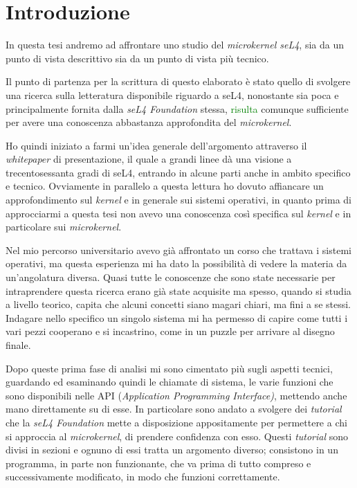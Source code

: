 \chapter{Introduzione}
In questa tesi andremo ad affrontare uno studio del \textit{microkernel seL4}, sia da un punto di vista descrittivo sia da un punto di vista più tecnico.

Il punto di partenza per la scrittura di questo elaborato è stato quello di svolgere una ricerca sulla letteratura disponibile riguardo a seL4, nonostante sia poca e principalmente fornita dalla \textit{seL4 Foundation} stessa, \textcolor{green}{risulta} comunque sufficiente per avere una conoscenza abbastanza approfondita del \textit{microkernel}.

Ho quindi iniziato a farmi un'idea generale dell'argomento attraverso il \textit{whitepaper} \cite{sel4-whitepaper} di presentazione, il quale a grandi linee dà una visione a trecentosessanta gradi di seL4, entrando in alcune parti anche in ambito specifico e tecnico. Ovviamente in parallelo a questa lettura ho dovuto affiancare un approfondimento sul \textit{kernel} e in generale sui sistemi operativi, in quanto prima di approcciarmi a questa tesi non avevo una conoscenza così specifica sul \textit{kernel} e in particolare sui \textit{microkernel}.

Nel mio percorso universitario avevo già affrontato un corso che trattava i sistemi operativi, ma questa esperienza mi ha dato la possibilità di vedere la materia da un'angolatura diversa. Quasi tutte le conoscenze che sono state necessarie per intraprendere questa ricerca erano già state acquisite ma spesso, quando si studia a livello teorico, capita che alcuni concetti siano magari chiari, ma fini a se stessi. Indagare nello specifico un singolo sistema mi ha permesso di capire come tutti i vari pezzi cooperano e si incastrino, come in un puzzle per arrivare al disegno finale.

Dopo queste prima fase di analisi mi sono cimentato più sugli aspetti tecnici, guardando ed esaminando quindi le chiamate di sistema, le varie funzioni che sono disponibili nelle API (\textit{Application Programming Interface)}, mettendo anche mano direttamente su di esse. In particolare sono andato a svolgere dei \textit{tutorial} che la \textit{seL4 Foundation} mette a disposizione appositamente per permettere a chi si approccia al \textit{microkernel}, di prendere confidenza con esso. Questi \textit{tutorial} sono divisi in sezioni e ognuno di essi tratta un argomento diverso; consistono in un programma, in parte non funzionante, che va prima di tutto compreso e successivamente modificato, in modo che funzioni correttamente.

